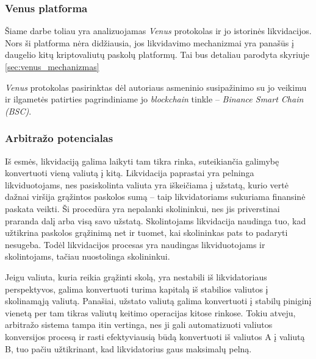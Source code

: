 \documentclass[]{VUMIFTemplateClass}
\begin{document}
\subsubsection{Venus platforma}


Šiame darbe toliau yra analizuojamas \textit{Venus} protokolas ir jo istorinės likvidacijos. Nors ši platforma nėra didžiausia, jos likvidavimo mechanizmai yra panašūs į daugelio kitų kriptovaliutų paskolų platformų. Tai bus detaliau parodyta skyriuje \ref{sec:venus_mechanizmas}

\textit{Venus} protokolas pasirinktas dėl autoriaus asmeninio susipažinimo su jo veikimu ir ilgametės patirties pagrindiniame jo \textit{blockchain} tinkle – \textit{Binance Smart Chain (BSC)}.

\subsubsection{Arbitražo potencialas}
Iš esmės, likvidaciją galima laikyti tam tikra rinka, suteikiančia galimybę konvertuoti vieną valiutą į kitą. Likvidacija paprastai yra pelninga likviduotojams, nes pasiskolinta valiuta yra iškeičiama į užstatą, kurio vertė dažnai viršija grąžintos paskolos sumą – taip likvidatoriams sukuriama finansinė paskata veikti. Ši procedūra yra nepalanki skolininkui, nes jis priverstinai praranda dalį arba visą savo užstatą. Skolintojams likvidacija naudinga tuo, kad užtikrina paskolos grąžinimą net ir tuomet, kai skolininkas pats to padaryti nesugeba. Todėl likvidacijos procesas yra naudingas likviduotojams ir skolintojams, tačiau nuostolinga skolininkui.

Jeigu valiuta, kuria reikia grąžinti skolą, yra nestabili iš likvidatoriaus perspektyvos, galima konvertuoti turima kapitalą iš stabilios valiutos į skolinamąją valiutą. Panašiai, užstato valiutą galima konvertuoti į stabilų piniginį vienetą per tam tikras valiutų keitimo operacijas kitose rinkose. Tokiu atveju, arbitražo sistema tampa itin vertinga, nes ji gali automatizuoti valiutos konversijos procesą ir rasti efektyviausią būdą konvertuoti iš valiutos A į valiutą B, tuo pačiu užtikrinant, kad likvidatorius gaus maksimalų pelną.
\end{document}
